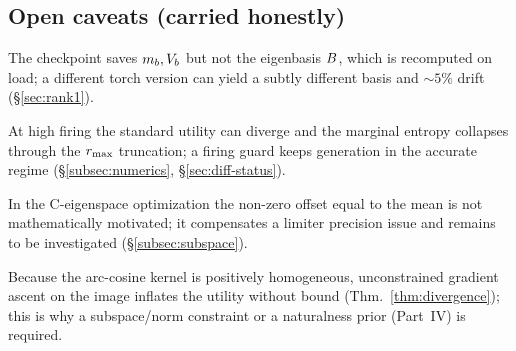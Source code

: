 \subsection{Open caveats (carried honestly)}
\begin{description}[leftmargin=0pt,itemsep=3pt]
  \item[Checkpoint basis drift.] The checkpoint saves $m_{b},V_{b}$ but not the
    eigenbasis $B$, which is recomputed on load; a different torch version can
    yield a subtly different basis and $\sim5\%$ drift (\S\ref{sec:rank1}).
  \item[Utility accuracy ceiling.] At high firing the standard utility can diverge
    and the marginal entropy collapses through the $r_{\max}$ truncation; a firing
    guard keeps generation in the accurate regime (\S\ref{subsec:numerics},
    \S\ref{sec:diff-status}).
  \item[Subspace offset.] In the C-eigenspace optimization the non-zero offset
    equal to the mean is not mathematically motivated; it compensates a limiter
    precision issue and remains to be investigated (\S\ref{subsec:subspace}).
  \item[Divergence under free ascent.] Because the arc-cosine kernel is positively
    homogeneous, unconstrained gradient ascent on the image inflates the utility
    without bound (Thm.~\ref{thm:divergence}); this is why a subspace/norm
    constraint or a naturalness prior (Part~IV) is required.
\end{description}

\clearpage
